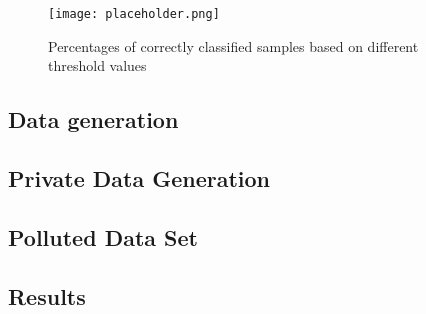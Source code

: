 \begin{figure}[h]
    \centering
    \texttt{[image: placeholder.png]}
    \caption{Percentages of correctly classified samples based on different threshold values}
    \label{fig:thres_baseline}
\end{figure}




\subsection{Data generation}

\subsection{Private Data Generation}

\subsection{Polluted Data Set}

\subsection{Results}